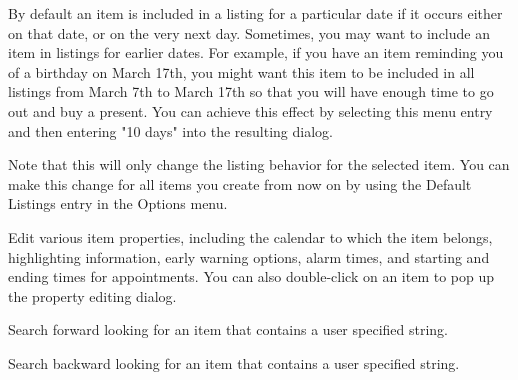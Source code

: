\documentclass[a4paper,english]{article}
\begin{document}
\begin{Description}
        \item[Early Warning]
            By default an item is included in a listing for a
            particular date if it occurs either on that date, or on
            the very next day.  Sometimes, you may want to include an
            item in listings for earlier dates. For example, if you
            have an item reminding you of a birthday on March 17th,
            you might want this item to be included in all listings
            from March 7th to March 17th so that you will have enough
            time to go out and buy a present.  You can achieve this
            effect by selecting this menu entry and then entering "10
            days" into the resulting dialog.

            Note that this will only change the listing behavior for
            the selected item.  You can make this change for all items
            you create from now on by using the Default Listings entry
            in the Options menu.

        \item[Properties ...]
            Edit various item properties, including the calendar to
            which the item belongs, highlighting information, early
            warning options, alarm times, and starting and ending
            times for appointments.  You can also double-click on an
            item to pop up the property editing dialog.

        \item[Search Forward]
            Search forward looking for an item that contains a user
            specified string.

        \item[Search Backward]
            Search backward looking for an item that contains a user
            specified string.

        \end{Description}
\end{document}
